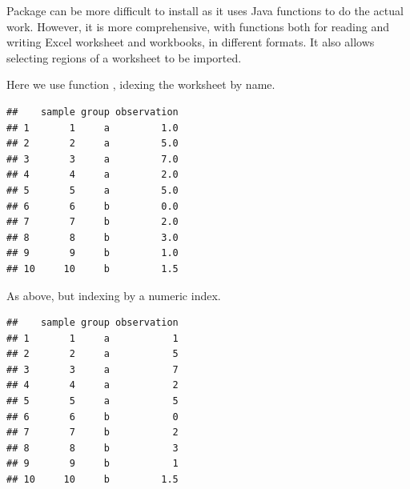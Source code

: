 \documentclass[krantz2]{krantz}\usepackage{knitr}%
\begin{document}
Package  can be more difficult to install as it uses Java functions to do the actual work. However, it is more comprehensive, with functions both for reading and writing Excel worksheet and workbooks, in different formats. It also allows selecting regions of a worksheet to be imported.

Here we use function , idexing the worksheet by name.

\begin{knitrout}\footnotesize
{}\color{fgcolor}\begin{kframe}
\begin{alltt}
 \hlkwb{<-} \hlstd{(}\hlstd{,}  \hlstd{=} \hlstd{)}
\end{alltt}
\begin{verbatim}
##    sample group observation
## 1       1     a         1.0
## 2       2     a         5.0
## 3       3     a         7.0
## 4       4     a         2.0
## 5       5     a         5.0
## 6       6     b         0.0
## 7       7     b         2.0
## 8       8     b         3.0
## 9       9     b         1.0
## 10     10     b         1.5
\end{verbatim}
\end{kframe}
\end{knitrout}

As above, but indexing by a numeric index.

\begin{knitrout}\footnotesize
{}\color{fgcolor}\begin{kframe}
\begin{alltt}
 \hlkwb{<-} \hlstd{(}\hlstd{,}  \hlstd{=} \hlstd{)}
\end{alltt}
\begin{verbatim}
##    sample group observation
## 1       1     a           1
## 2       2     a           5
## 3       3     a           7
## 4       4     a           2
## 5       5     a           5
## 6       6     b           0
## 7       7     b           2
## 8       8     b           3
## 9       9     b           1
## 10     10     b         1.5
\end{verbatim}
\end{kframe}
\end{knitrout}
\end{document}
